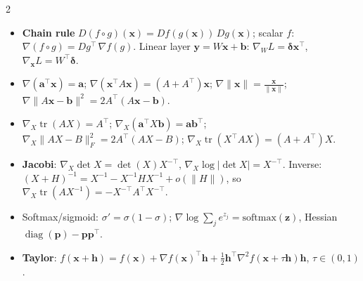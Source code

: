 \documentclass[10pt]{article}
\newcommand{\norm}[1]{\lVert #1 \rVert}
\DeclareMathOperator{\tr}{tr}
\DeclareMathOperator{\diag}{diag}
\newcommand{\topic}[1]{\par\smallskip\noindent{\color{blue!50!black}\textbf{#1}}\par}
\begin{document}
\begin{multicols}{2}

\topic{Derivatives}
\begin{itemize}
    \item \textbf{Chain rule} $D(f \circ g)(\mathbf{x}) = Df(g(\mathbf{x}))\,Dg(\mathbf{x})$; scalar $f$: $\nabla(f \circ g) = Dg^\top\,\nabla f(g)$. Linear layer $\mathbf{y} = W\mathbf{x} + \mathbf{b}$: $\nabla_W L = \boldsymbol\delta\mathbf{x}^\top$, $\nabla_{\mathbf{x}}L = W^\top\boldsymbol\delta$.
    \item $\nabla(\mathbf{a}^\top\mathbf{x}) = \mathbf{a}$; $\nabla(\mathbf{x}^\top A\mathbf{x}) = (A + A^\top)\mathbf{x}$; $\nabla\norm{\mathbf{x}} = \frac{\mathbf{x}}{\norm{\mathbf{x}}}$; $\nabla\norm{A\mathbf{x} - \mathbf{b}}^2 = 2A^\top(A\mathbf{x} - \mathbf{b})$.
    \item $\nabla_X\tr(AX) = A^\top$; $\nabla_X(\mathbf{a}^\top X\mathbf{b}) = \mathbf{a}\mathbf{b}^\top$; $\nabla_X\norm{AX - B}_F^2 = 2A^\top(AX - B)$; $\nabla_X\tr(X^\top AX) = (A + A^\top)X$.
    \item \textbf{Jacobi}: $\nabla_X\det X = \det(X)X^{-\top}$, $\nabla_X\log|\det X| = X^{-\top}$. Inverse: $(X + H)^{-1} = X^{-1} - X^{-1}HX^{-1} + o(\norm{H})$, so $\nabla_X\tr(AX^{-1}) = -X^{-\top}A^\top X^{-\top}$.
    \item Softmax/sigmoid: $\sigma' = \sigma(1 - \sigma)$; $\nabla\log\sum_j e^{z_j} = \mathrm{softmax}(\mathbf{z})$, Hessian $\diag(\mathbf{p}) - \mathbf{p}\mathbf{p}^\top$.
    \item \textbf{Taylor}: $f(\mathbf{x} + \mathbf{h}) = f(\mathbf{x}) + \nabla f(\mathbf{x})^\top\mathbf{h} + \frac{1}{2}\mathbf{h}^\top\nabla^2 f(\mathbf{x} + \tau\mathbf{h})\mathbf{h}$, $\tau \in (0, 1)$.
\end{itemize}


\end{multicols}
\end{document}
